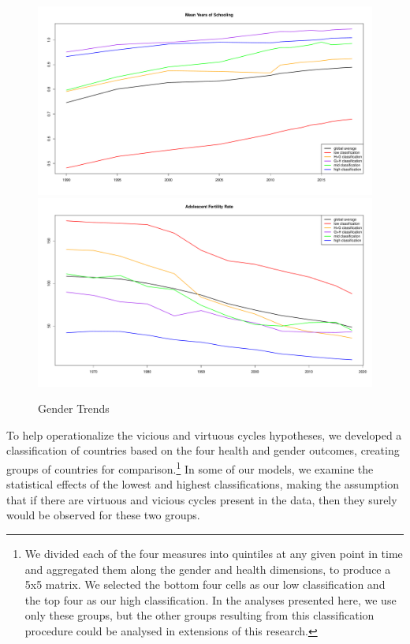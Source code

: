 \documentclass[12pt]{article}
\begin{document}
\begin{figure}[!htb]
    \centering
    \caption{Gender Trends}
    \label{trends}
    \includegraphics[width=\textwidth]{trend_mys_ratio_hdr.pdf}
    \includegraphics[width=\textwidth]{trend_asfr_adol_wpp.pdf}
\end{figure}


To help operationalize the vicious and virtuous cycles hypotheses, we developed a classification of countries based on the four health and gender outcomes, creating groups of countries for comparison.\footnote{We divided each of the four measures into quintiles at any given point in time and aggregated them along the gender and health dimensions, to produce a 5x5 matrix. We selected the bottom four cells as our low classification and the top four as our high classification. In the analyses presented here, we use only these groups, but the other groups resulting from this classification procedure could be analysed in extensions of this research.}
In some of our models, we examine the statistical effects of the lowest and highest classifications, making the assumption that if there are virtuous and vicious cycles present in the data, then they surely would be observed for these two groups.
\end{document}
